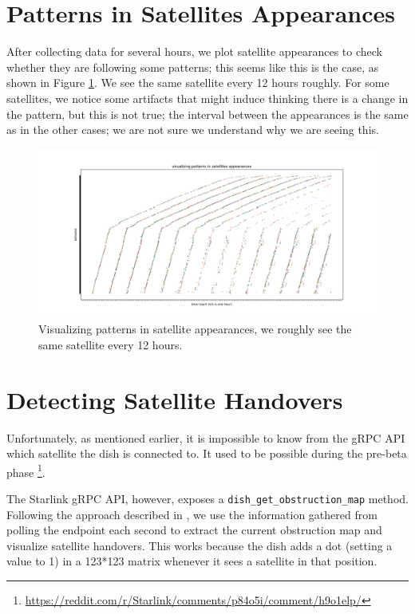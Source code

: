 \documentclass[IN,11pt,twoside,openright,idp,english]{tumthesis}
\begin{document}
\section{Patterns in Satellites Appearances}

After collecting data for several hours, we plot satellite appearances to check whether they are following some patterns; this seems like this is the case, as shown in Figure \ref{fig:vis-sat-pat}. We see the same satellite every 12 hours roughly. For some satellites, we notice some artifacts that might induce thinking there is a change in the pattern, but this is not true; the interval between the appearances is the same as in the other cases; we are not sure we understand why we are seeing this.

\begin{figure}
    \centering
    \includegraphics[width=1.0\columnwidth]{img/visualizing-how-long-satellites-are-visible-for.png}
    \caption{Visualizing patterns in satellite appearances, we roughly see the same satellite every 12 hours.}
    \label{fig:vis-sat-pat}
\end{figure}

\section{Detecting Satellite Handovers}

Unfortunately, as mentioned earlier, it is impossible to know from the gRPC API which satellite the dish is connected to. It used to be possible during the pre-beta phase \footnote{\url{https://reddit.com/r/Starlink/comments/p84o5i/comment/h9o1elp/}}.

The Starlink gRPC API, however, exposes a \texttt{dish\_get\_obstruction\_map} method. Following the approach described in \cite{izhikevich2023democratizing}, we use the information gathered from polling the endpoint each second to extract the current obstruction map and visualize satellite handovers. This works because the dish adds a dot (setting a value to 1) in a 123*123 matrix whenever it sees a satellite in that position. 
\end{document}
